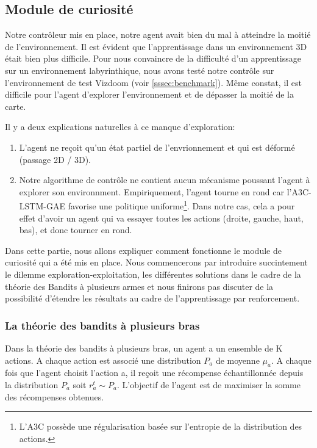 \subsection{Module de curiosité}

Notre contrôleur mis en place, notre agent avait bien du mal à atteindre la moitié de l'environnement. Il est évident que l'apprentissage dans un environnement 3D était bien plus difficile. Pour nous convaincre de la difficulté d'un apprentissage sur un environnement labyrinthique, nous avons testé notre contrôle sur l'environnement de test Vizdoom (voir \ref{sssec:benchmark}). Même constat, il est difficile pour l'agent d'explorer l'environnement et de dépasser la moitié de la carte.

Il y a deux explications naturelles à ce manque d'exploration:

\begin{enumerate}
\item L'agent ne reçoit qu'un état partiel de l'envrionnement et qui est déformé (passage 2D / 3D). 
\item Notre algorithme de contrôle ne contient aucun mécanisme poussant l'agent à explorer son environnment. Empiriquement, l'agent tourne en rond car l'A3C-LSTM-GAE favorise une politique uniforme\footnote{L'A3C possède une régularisation basée sur l'entropie de la distribution des actions.}. Dans notre cas, cela a pour effet d'avoir un agent qui va essayer toutes les actions (droite, gauche, haut, bas), et donc tourner en rond.
\end{enumerate}

Dans cette partie, nous allons expliquer comment fonctionne le module de curiosité qui a été mis en place. Nous commencerons par introduire succintement le dilemme exploration-exploitation, les différentes solutions dans le cadre de la théorie des Bandits à plusieurs armes et nous finirons pas discuter de la possibilité d'étendre les résultats au cadre de l'apprentissage par renforcement.

\subsubsection{La théorie des bandits à plusieurs bras}

Dans la théorie des bandits à plusieurs bras, un agent a un ensemble de K actions. A chaque action est associé une distribution $P_a$ de moyenne $\mu_a$. A chaque fois que l'agent choisit l'action a, il reçoit une récompense échantillonnée depuis la distribution $P_a$ soit $r^t_a \sim P_a$. L'objectif de l'agent est de maximiser la somme des récompenses obtenues. 

